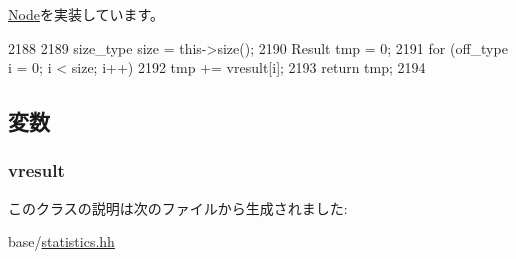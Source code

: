 \hyperlink{classStats_1_1Node_ab152b7e89b37a7db03b04d500ceb8349}{Node}を実装しています。


\begin{DoxyCode}
2188     {
2189         size_type size = this->size();
2190         Result tmp = 0;
2191         for (off_type i = 0; i < size; i++)
2192             tmp += vresult[i];
2193         return tmp;
2194     }
\end{DoxyCode}


\subsection{変数}
\hypertarget{classStats_1_1ConstVectorNode_a8f41af856442757ec68f3391333d3eb2}{
\subsubsection[{vresult}]{ {\bf vresult}}}
\label{classStats_1_1ConstVectorNode_a8f41af856442757ec68f3391333d3eb2}


このクラスの説明は次のファイルから生成されました:\begin{DoxyCompactItemize}
\item 
base/\hyperlink{statistics_8hh}{statistics.hh}\end{DoxyCompactItemize}
